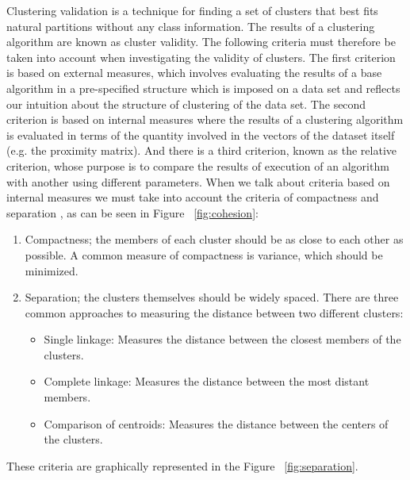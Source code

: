 Clustering validation is a technique for finding a set of clusters that best fits natural partitions without any class information. The results of a clustering algorithm are known as cluster validity. The following criteria must therefore be taken into account when investigating the validity of clusters. The first criterion is based on external measures, which involves evaluating the results of a base algorithm in a pre-specified structure which is imposed on a data set and reflects our intuition about the structure of clustering of the data set. The second criterion is based on internal measures where the results of a clustering algorithm is evaluated in terms of the quantity involved in the vectors of the dataset itself (e.g. the proximity matrix). And there is a third criterion, known as the relative criterion, whose purpose is to compare the results of execution of an algorithm with another using different parameters.
When we talk about criteria based on internal measures we must take into account the criteria of compactness and separation \citep{b53} \citep{b52}, as can be seen in Figure ~\ref{fig:cohesion}:
\begin{enumerate}
  \item Compactness; the members of each cluster should be as close to each other as possible. A common measure of compactness is variance, which should be minimized.
  \item Separation; the clusters themselves should be widely spaced. There are three common approaches to measuring the distance between two different clusters:
  \begin{itemize}
  \item Single linkage: Measures the distance between the closest members of the clusters.
  \item Complete linkage: Measures the distance between the most distant members.
  \item Comparison of centroids: Measures the distance between the centers of the clusters.
\end{itemize}
\end{enumerate}
These criteria are graphically represented in the Figure ~\ref{fig:separation}.

